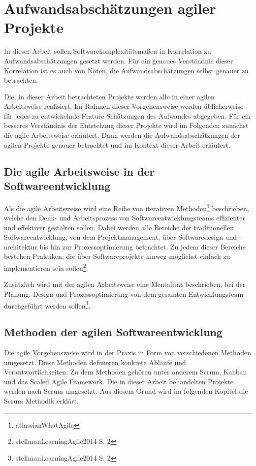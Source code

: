 \chapter{Aufwandsabschätzungen agiler Projekte}\label{aufwandsabschuxe4tzungen-agiler-projekte}

In dieser Arbeit sollen Softwarekomplexitätsmaßen in Korrelation zu
Aufwandsabschätzungen gesetzt werden. Für ein genaues Verständnis dieser
Korrelation ist es auch von Nöten, die Aufwandsabschätzungen selbst
genauer zu betrachten.

Die, in dieser Arbeit betrachteten Projekte werden alle in einer agilen
Arbeitsweise realisiert. Im Rahmen dieser Vorgehensweise werden
üblicherweise für jedes zu entwickelnde Feature Schätzungen des
Aufwandes abgegeben. Für ein besseres Verständnis der Entstehung dieser
Projekte wird im Folgenden zunächst die agile Arbeitsweise erläutert.
Dann werden die Aufwandsabschätzungen der agilen Projekte genauer
betrachtet und im Kontext dieser Arbeit erläutert.

\section{Die agile Arbeitsweise in der
Softwareentwicklung}\label{die-agile-arbeitsweise-in-der-softwareentwicklung}

Als die agile Arbeitsweise wird eine Reihe von iterativen
Methoden\footnote{atlassianWhatAgile} beschrieben, welche den Denk- und
Arbeitsprozess von Softwareentwicklungsteams effizienter und effektiver
gestalten sollen. Dabei werden alle Bereiche der traditionellen
Softwareentwicklung, von dem Projektmanagement, über Softwaredesign und
-architektur bis hin zur Prozessoptimierung betrachtet. Zu jedem dieser
Bereiche bestehen Praktiken, die über Softwareprojekte hinweg möglichst
einfach zu implementieren sein sollen\footnote{stellmanLearningAgile2014
  S. 2}.

Zusätzlich wird mit der agilen Arbeitsweise eine Mentalität beschrieben,
bei der Planung, Design und Prozessoptimierung von dem gesamten
Entwicklungsteam durchgeführt werden sollen\footnote{stellmanLearningAgile2014
  S. 2}.

\section{Methoden der agilen Softwareentwicklung}\label{methoden-der-agilen-softwareentwicklung}

Die agile Vorgehensweise wird in der Praxis in Form von verschiedenen
Methoden umgesetzt. Diese Methoden definieren konkrete Abläufe und
Verantwortlichkeiten. Zu dem Methoden gehören unter anderem Scrum,
Kanban und das Scaled Agile Framework. Die in dieser Arbeit behandelten
Projekte werden nach Scrum umgesetzt. Aus diesem Grund wird im folgenden
Kapitel die Scrum Methodik erklärt.

